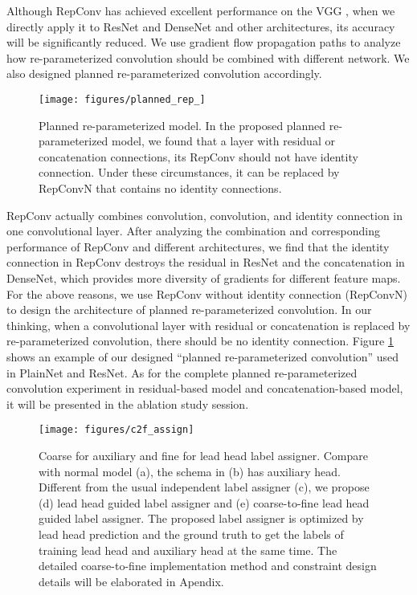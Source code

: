 \documentclass[10pt,twocolumn,letterpaper]{article}
\begin{document}
		Although RepConv \cite{ding2021repvgg} has achieved excellent performance on the VGG \cite{simonyan2014very}, when we directly apply it to ResNet \cite{he2016deep} and DenseNet \cite{huang2017densely} and other architectures, its accuracy will be significantly reduced. We use gradient flow propagation paths to analyze how re-parameterized convolution should be combined with different network. We also designed planned re-parameterized convolution accordingly.
		
		\begin{figure}[h]
			\begin{center}
				\texttt{[image: figures/planned\_rep\_]}
			\end{center}
			\caption{Planned re-parameterized model.  In the proposed planned re-parameterized model, we found that a layer with residual or concatenation connections, its RepConv should not have identity connection.  Under these circumstances, it can be replaced by RepConvN that contains no identity connections.}
			\label{fig:prep}
			\vspace{-2mm}
		\end{figure}
		
		RepConv actually combines  convolution,   convolution, and identity connection in one convolutional layer. After analyzing the combination and corresponding performance of RepConv and different architectures, we find that the identity connection in RepConv destroys the residual in ResNet and the concatenation in DenseNet, which provides more diversity of gradients for different feature maps. For the above reasons, we use RepConv without identity connection (RepConvN) to design the architecture of planned re-parameterized convolution. In our thinking, when a convolutional layer with residual or concatenation is replaced by re-parameterized convolution, there should be no identity connection. Figure \ref{fig:prep} shows an example of our designed ``planned re-parameterized convolution'' used in PlainNet and ResNet. As for the complete planned re-parameterized convolution experiment in residual-based model and concatenation-based model, it will be presented in the ablation study session.
		
		\begin{figure*}[h]
			\begin{center}
				\texttt{[image: figures/c2f\_assign]}
			\end{center}
			\caption{Coarse for auxiliary and fine for lead head label assigner.  Compare with normal model (a), the schema in (b) has auxiliary head. Different from the usual independent label assigner (c), we propose (d) lead head guided label assigner and (e) coarse-to-fine lead head guided label assigner.  The proposed label assigner is optimized by lead head prediction and the ground truth to get the labels of training lead head and auxiliary head at the same time.  The detailed coarse-to-fine implementation method and constraint design details will be elaborated in Apendix.}
			\label{fig:ctof}
\end{figure*}
		
\end{document}
